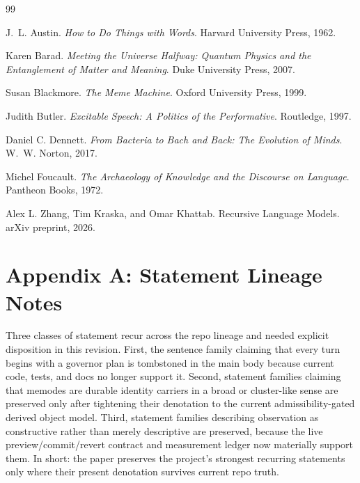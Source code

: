 \documentclass[10pt]{article}
\begin{document}
\begin{thebibliography}{99}

J.~L. Austin.
\newblock \emph{How to Do Things with Words}.
\newblock Harvard University Press, 1962.

Karen Barad.
\newblock \emph{Meeting the Universe Halfway: Quantum Physics and the Entanglement of Matter and Meaning}.
\newblock Duke University Press, 2007.

Susan Blackmore.
\newblock \emph{The Meme Machine}.
\newblock Oxford University Press, 1999.

Judith Butler.
\newblock \emph{Excitable Speech: A Politics of the Performative}.
\newblock Routledge, 1997.

Daniel C. Dennett.
\newblock \emph{From Bacteria to Bach and Back: The Evolution of Minds}.
\newblock W.~W. Norton, 2017.

Michel Foucault.
\newblock \emph{The Archaeology of Knowledge and the Discourse on Language}.
\newblock Pantheon Books, 1972.

Alex L. Zhang, Tim Kraska, and Omar Khattab.
\newblock Recursive Language Models.
\newblock arXiv preprint, 2026.

\end{thebibliography}

\appendix

\section{Appendix A: Statement Lineage Notes}

Three classes of statement recur across the repo lineage and needed explicit disposition in this revision. First, the sentence family claiming that every turn begins with a governor plan is tombstoned in the main body because current code, tests, and docs no longer support it. Second, statement families claiming that memodes are durable identity carriers in a broad or cluster-like sense are preserved only after tightening their denotation to the current admissibility-gated derived object model. Third, statement families describing observation as constructive rather than merely descriptive are preserved, because the live preview/commit/revert contract and measurement ledger now materially support them. In short: the paper preserves the project's strongest recurring statements only where their present denotation survives current repo truth.
\end{document}
